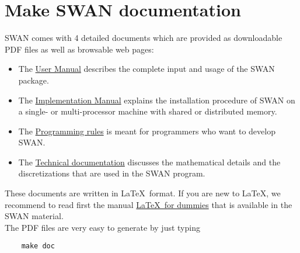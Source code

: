 \documentclass[12pt]{book}
\begin{document}
\section{Make SWAN documentation} \label{sec:makedoc}

SWAN comes with 4 detailed documents which are provided as downloadable PDF files as well as browsable web pages:
\begin{itemize}
  \item The \underline{User Manual} describes the complete input and usage of the SWAN package.
  \item The \underline{Implementation Manual} explains the installation procedure of SWAN on a single- or multi-processor machine
        with shared or distributed memory.
  \item The \underline{Programming rules} is meant for programmers who want to develop SWAN.
  \item The \underline{Technical documentation} discusses the mathematical details and the discretizations that are used in the SWAN program.
\end{itemize}
These documents are written in \LaTeX~format. If you are new to \LaTeX, we recommend to read first the manual \underline{\LaTeX~for dummies}
that is available in the SWAN material.
\\[2ex]
\noindent
The PDF files are very easy to generate by just typing
\begin{verbatim}
    make doc
\end{verbatim}

 \label{ch:usechan}
\end{document}
